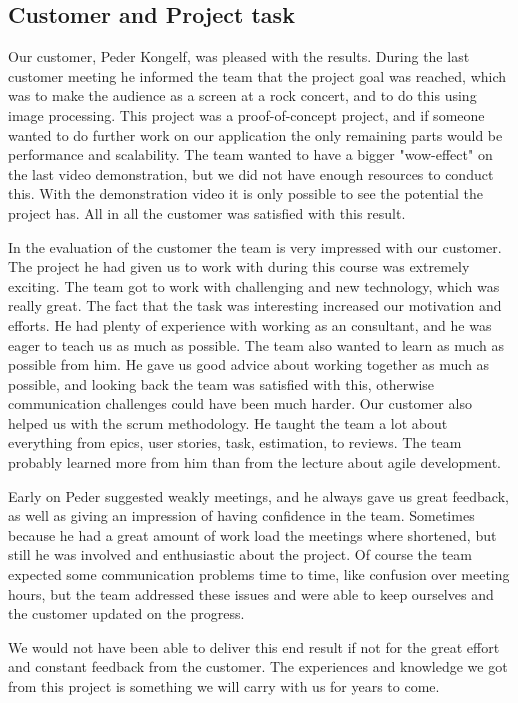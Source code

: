 \subsection{Customer and Project task} 
Our customer, Peder Kongelf, was pleased with the results. During the last customer meeting he informed the team that the project goal was reached, which was to make the audience as a screen at a rock concert, and to do this using image processing.
This project was a proof-of-concept project, and if someone wanted to do further work on our application the only remaining parts would be performance and scalability. 
The team wanted to have a bigger "wow-effect" on the last video demonstration, but we did not have enough resources to conduct this. With the demonstration video it is only possible to see the potential the project has. All in all the customer was satisfied with this result. 

In the evaluation of the customer the team is very impressed with our customer. The project he had given us to work with during this course was extremely exciting. The team got to work with challenging and new technology, which was really great. The fact that the task was interesting increased our motivation and efforts. He had plenty of experience with working as an consultant, and he was eager to teach us as much as possible. The team also wanted to learn as much as possible from him. He gave us good advice about working together as much as possible, and looking back the team was satisfied with this, otherwise communication challenges could have been much harder. Our customer also helped us with the scrum methodology. He taught the team a lot about everything from epics, user stories, task, estimation, to reviews. The team probably learned more from him than from the lecture about agile development. 

Early on Peder suggested weakly meetings, and he always gave us great feedback, as well as giving an impression of having confidence in the team. Sometimes because he had a great amount of work load the meetings where shortened, but still he was involved and enthusiastic about the project. Of course the team expected some communication problems time to time, like confusion over meeting hours, but the team addressed these issues and were able to keep ourselves and the customer updated on the progress.

We would not have been able to deliver this end result if not for the great effort and constant feedback from the customer. The experiences and knowledge we got from this project is something we will carry with us for years to come.

